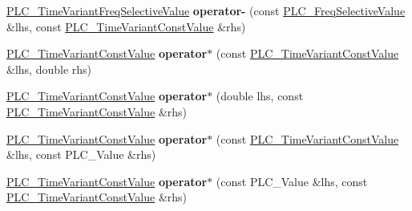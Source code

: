 \begin{DoxyCompactItemize}
\item 
\hypertarget{classns3_1_1PLC__TimeVariantConstValue_a22bab1bb6d37a86e6bd3e6b979d911ea}{\hyperlink{classns3_1_1PLC__TimeVariantFreqSelectiveValue}{\-P\-L\-C\-\_\-\-Time\-Variant\-Freq\-Selective\-Value} {\bfseries operator-\/} (const \hyperlink{classns3_1_1PLC__FreqSelectiveValue}{\-P\-L\-C\-\_\-\-Freq\-Selective\-Value} \&lhs, const \hyperlink{classns3_1_1PLC__TimeVariantConstValue}{\-P\-L\-C\-\_\-\-Time\-Variant\-Const\-Value} \&rhs)}\label{classns3_1_1PLC__TimeVariantConstValue_a22bab1bb6d37a86e6bd3e6b979d911ea}

\item 
\hypertarget{classns3_1_1PLC__TimeVariantConstValue_ab448baf9ff1287c554efd62db5a06b4c}{\hyperlink{classns3_1_1PLC__TimeVariantConstValue}{\-P\-L\-C\-\_\-\-Time\-Variant\-Const\-Value} {\bfseries operator$\ast$} (const \hyperlink{classns3_1_1PLC__TimeVariantConstValue}{\-P\-L\-C\-\_\-\-Time\-Variant\-Const\-Value} \&lhs, double rhs)}\label{classns3_1_1PLC__TimeVariantConstValue_ab448baf9ff1287c554efd62db5a06b4c}

\item 
\hypertarget{classns3_1_1PLC__TimeVariantConstValue_a1c73efd3863dba75d00f1ee4e323f8b1}{\hyperlink{classns3_1_1PLC__TimeVariantConstValue}{\-P\-L\-C\-\_\-\-Time\-Variant\-Const\-Value} {\bfseries operator$\ast$} (double lhs, const \hyperlink{classns3_1_1PLC__TimeVariantConstValue}{\-P\-L\-C\-\_\-\-Time\-Variant\-Const\-Value} \&rhs)}\label{classns3_1_1PLC__TimeVariantConstValue_a1c73efd3863dba75d00f1ee4e323f8b1}

\item 
\hypertarget{classns3_1_1PLC__TimeVariantConstValue_ad86144b4affd1348d6c7e39721955384}{\hyperlink{classns3_1_1PLC__TimeVariantConstValue}{\-P\-L\-C\-\_\-\-Time\-Variant\-Const\-Value} {\bfseries operator$\ast$} (const \hyperlink{classns3_1_1PLC__TimeVariantConstValue}{\-P\-L\-C\-\_\-\-Time\-Variant\-Const\-Value} \&lhs, const \-P\-L\-C\-\_\-\-Value \&rhs)}\label{classns3_1_1PLC__TimeVariantConstValue_ad86144b4affd1348d6c7e39721955384}

\item 
\hypertarget{classns3_1_1PLC__TimeVariantConstValue_a79789c82ab0873a08f4b9964c661fc18}{\hyperlink{classns3_1_1PLC__TimeVariantConstValue}{\-P\-L\-C\-\_\-\-Time\-Variant\-Const\-Value} {\bfseries operator$\ast$} (const \-P\-L\-C\-\_\-\-Value \&lhs, const \hyperlink{classns3_1_1PLC__TimeVariantConstValue}{\-P\-L\-C\-\_\-\-Time\-Variant\-Const\-Value} \&rhs)}\label{classns3_1_1PLC__TimeVariantConstValue_a79789c82ab0873a08f4b9964c661fc18}


\end{DoxyCompactItemize}
